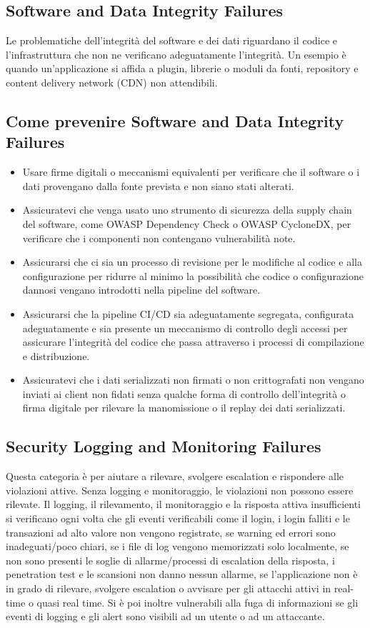 \subsection{Software and Data Integrity Failures}
Le problematiche dell'integrità del software e dei dati riguardano il codice e l'infrastruttura che non ne verificano adeguatamente l'integrità. Un esempio è quando un'applicazione si affida a plugin, librerie o moduli da fonti, repository e content delivery network (CDN) non attendibili.
\subsection{Come prevenire Software and Data Integrity Failures}
\begin{itemize}
    \item Usare firme digitali o meccanismi equivalenti per verificare che il software o i dati provengano dalla fonte prevista e non siano stati alterati.
    \item Assicuratevi che venga usato uno strumento di sicurezza della supply chain del software, come OWASP Dependency Check o OWASP CycloneDX, per verificare che i componenti non contengano vulnerabilità note.
    \item Assicurarsi che ci sia un processo di revisione per le modifiche al codice e alla configurazione per ridurre al minimo la possibilità che codice o configurazione dannosi vengano introdotti nella pipeline del software.
    \item Assicurarsi che la pipeline CI/CD sia adeguatamente segregata, configurata adeguatamente e sia presente un meccanismo di controllo degli accessi per assicurare l'integrità del codice che passa attraverso i processi di compilazione e distribuzione.
    \item Assicuratevi che i dati serializzati non firmati o non crittografati non vengano inviati ai client non fidati senza qualche forma di controllo dell'integrità o firma digitale per rilevare la manomissione o il replay dei dati serializzati.  
\end{itemize}
\subsection{Security Logging and Monitoring Failures}
Questa categoria è per aiutare a rilevare, svolgere escalation e rispondere alle violazioni attive. Senza logging e monitoraggio, le violazioni non possono essere rilevate. Il logging, il rilevamento, il monitoraggio e la risposta attiva insufficienti si verificano ogni volta che gli eventi verificabili come il login, i login falliti e le transazioni ad alto valore non vengono registrate, se warning ed errori sono inadeguati/poco chiari, se i file di log vengono memorizzati solo localmente, se non sono presenti le soglie di allarme/processi di escalation della risposta, i penetration test e le scansioni non danno nessun allarme, se l’applicazione non è in grado di rilevare, svolgere escalation o avvisare per gli attacchi attivi in real-time o quasi real time. Si è poi inoltre vulnerabili alla fuga di informazioni se gli eventi di logging e gli alert sono visibili ad un utente o ad un attaccante.
